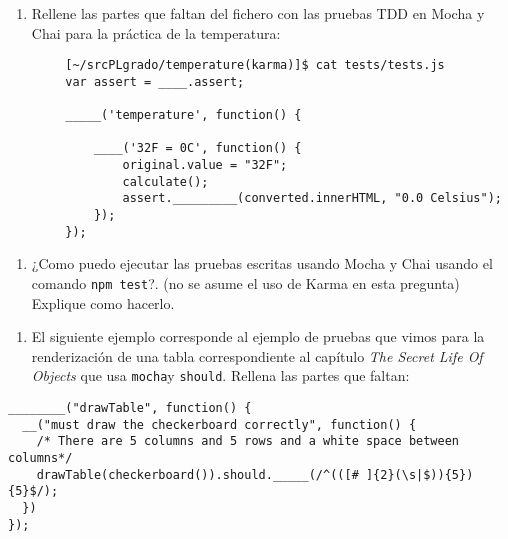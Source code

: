\begin{enumerate}
\def\labelenumi{\arabic{enumi}.}
\setcounter{enumi}{3}
\itemsep1pt\parskip0pt
\item
  Rellene las partes que faltan del fichero con las pruebas TDD en Mocha
  y Chai para la práctica de la temperatura:
\end{enumerate}

\begin{verbatim}
        [~/srcPLgrado/temperature(karma)]$ cat tests/tests.js
        var assert = ____.assert;

        _____('temperature', function() {

            ____('32F = 0C', function() {
                original.value = "32F";
                calculate();
                assert._________(converted.innerHTML, "0.0 Celsius");
            });
        });
\end{verbatim}

\begin{enumerate}
\def\labelenumi{\arabic{enumi}.}
\setcounter{enumi}{4}
\itemsep1pt\parskip0pt
\item
  ¿Como puedo ejecutar las pruebas escritas usando Mocha y Chai usando
  el comando \texttt{npm test}?. (no se asume el uso de Karma en esta
  pregunta) Explique como hacerlo.
\end{enumerate}

\begin{enumerate}
\def\labelenumi{\arabic{enumi}.}
\setcounter{enumi}{5}
\itemsep1pt\parskip0pt
\item
  El siguiente ejemplo corresponde al ejemplo de pruebas que vimos para
  la renderización de una tabla correspondiente al capítulo \emph{The
  Secret Life Of Objects} que usa \texttt{mocha}y \texttt{should}.
  Rellena las partes que faltan:
\end{enumerate}

\begin{verbatim}
________("drawTable", function() {
  __("must draw the checkerboard correctly", function() {
    /* There are 5 columns and 5 rows and a white space between columns*/
    drawTable(checkerboard()).should._____(/^(([# ]{2}(\s|$)){5}){5}$/);
  })
});
\end{verbatim}
